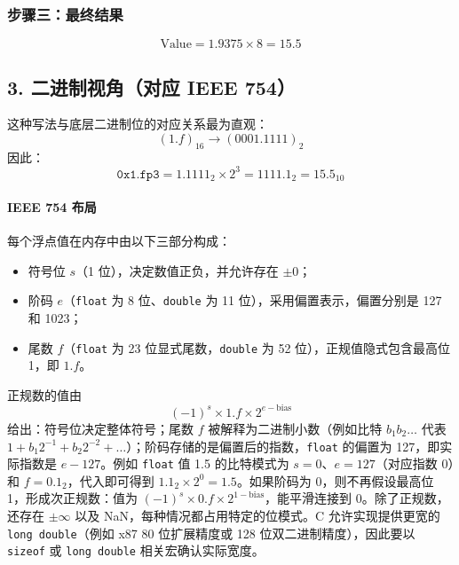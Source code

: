 \subsubsection*{步骤三：最终结果}
$$ \text{Value} = 1.9375 \times 8 = \mathbf{15.5} $$

\subsection*{3. 二进制视角（对应 IEEE 754）}
这种写法与底层二进制位的对应关系最为直观：
$$ (1.f)_{16} \rightarrow (0001.1111)_2 $$
因此：
$$ \texttt{0x1.fp3} = 1.1111_2 \times 2^3 = 1111.1_2 = 15.5_{10} $$




























\paragraph{IEEE 754 布局}
每个浮点值在内存中由以下三部分构成：
\begin{itemize}
  \item 符号位 $s$（1 位），决定数值正负，并允许存在 $\pm 0$；
  \item 阶码 $e$（\texttt{float} 为 8 位、\texttt{double} 为 11 位），采用偏置表示，偏置分别是 127 和 1023；
  \item 尾数 $f$（\texttt{float} 为 23 位显式尾数，\texttt{double} 为 52 位），正规值隐式包含最高位 1，即 $1.f$。
\end{itemize}
正规数的值由
\[
(-1)^s \times 1.f \times 2^{e-\text{bias}}
\]
给出：符号位决定整体符号；尾数 $f$ 被解释为二进制小数（例如比特 $b_1b_2\ldots$ 代表 $1 + b_1 2^{-1} + b_2 2^{-2} + \ldots$）；阶码存储的是偏置后的指数，\texttt{float} 的偏置为 127，即实际指数是 $e - 127$。例如 \texttt{float} 值 1.5 的比特模式为 $s=0$、$e=127$（对应指数 0）和 $f=0.1_2$，代入即可得到 $1.1_2 \times 2^0 = 1.5$。如果阶码为 0，则不再假设最高位 1，形成次正规数：值为 $(-1)^s \times 0.f \times 2^{1-\text{bias}}$，能平滑连接到 0。除了正规数，还存在 $\pm\infty$ 以及 NaN，每种情况都占用特定的位模式。C 允许实现提供更宽的 \texttt{long double}（例如 x87 80 位扩展精度或 128 位双二进制精度），因此要以 \texttt{sizeof} 或 \texttt{long double} 相关宏确认实际宽度。

